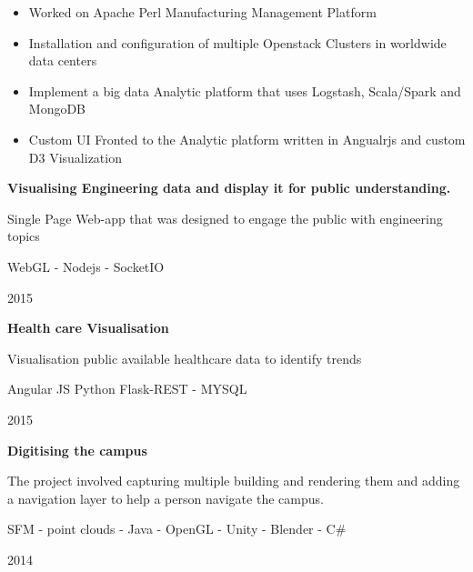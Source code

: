 \documentclass[10pt,a4paper,ragged2e,withhyper]{altacv}
\begin{document}
\begin{paracol}{2}
\divider

\begin{itemize}
 \item Worked on Apache Perl Manufacturing Management Platform
 \item Installation and configuration of multiple Openstack Clusters in worldwide data centers 
 \item Implement a big data Analytic platform that uses Logstash, Scala/Spark and MongoDB
 \item Custom UI Fronted to the Analytic platform written in Angualrjs and custom D3 Visualization
 \end{itemize}
 
\medskip
\medskip
{}

\textbf{Visualising Engineering data and display it for public understanding.}\par

Single Page Web-app that was designed to engage the public with engineering topics

\faCode \hspace{0.5em} WebGL - Nodejs - SocketIO

\faCalendar \hspace{0.5em} 2015

\divider

\textbf{Health care Visualisation}\par

Visualisation public available healthcare data to identify trends

\faCode \hspace{0.5em}  Angular JS Python Flask-REST - MYSQL

\faCalendar \hspace{0.5em} 2015

\divider

\textbf{Digitising the campus}\par

The project involved capturing multiple building and rendering them and adding a navigation layer to
help a person navigate the campus.

\faCode  \hspace{0.5em} SFM - point clouds - Java - OpenGL - Unity - Blender - C\#

\faCalendar \hspace{0.5em} 2014


\end{paracol}
\end{document}
